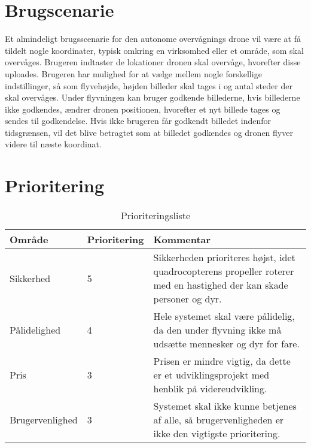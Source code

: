 \section{Brugscenarie}

Et almindeligt brugsscenarie for den autonome overvågnings drone vil være at få tildelt nogle koordinater, typisk omkring en virksomhed eller et område, som skal overvåges.
Brugeren indtaster de lokationer dronen skal overvåge, hvorefter disse uploades. 
Brugeren har mulighed for at vælge mellem nogle forskellige indstillinger, så som flyvehøjde, højden billeder skal tages i og antal steder der skal overvåges.
Under flyvningen kan bruger godkende billederne, hvis billederne ikke godkendes, ændrer dronen positionen, hvorefter et nyt billede tages og sendes til godkendelse. Hvis ikke brugeren får godkendt billedet indenfor tidsgrænsen, vil det blive betragtet som at billedet godkendes og dronen flyver videre til næste koordinat.

\section{Prioritering}

\begin{table}[H]
	\centering
		\begin{tabular}{|l|l|p{7 cm}|} 
		\hline
			Område & Prioritering & Kommentar \\ \hline
			Sikkerhed 		& 5 	& Sikkerheden prioriteres højst, idet quadrocopterens propeller roterer med en hastighed der kan skade personer og dyr.   \\ \hline
			
			Pålidelighed 	& 4 	& Hele systemet skal være pålidelig, da den under flyvning ikke må udsætte mennesker og dyr for fare.  \\ \hline
			
			Pris 			& 3 	& Prisen er mindre vigtig, da dette er et udviklingsprojekt med henblik på videreudvikling.   \\ \hline
			
			Brugervenlighed & 3 	& Systemet skal ikke kunne betjenes af alle, så brugervenligheden er ikke den vigtigste prioritering. \\ \hline
		\end{tabular}
	\caption{Prioriteringsliste}
\end{table}

